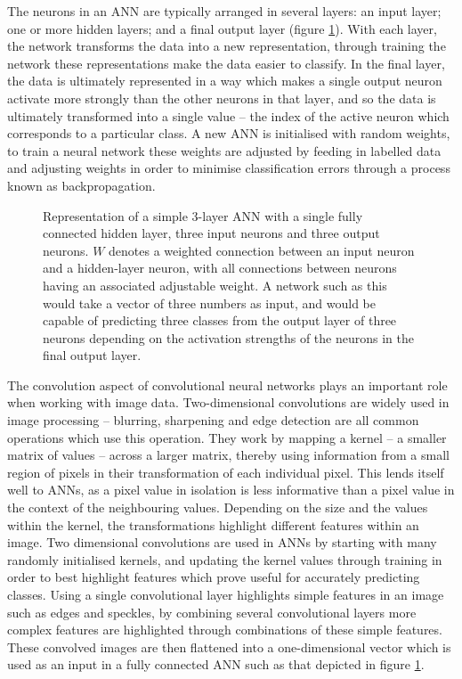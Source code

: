 \documentclass[a4paper,11pt,twoside,openright]{scrbook}
\begin{document}
The neurons in an ANN are typically arranged in several layers: an input layer; one or more hidden layers; and a final output layer (figure \ref{figure:nn_layers}).
With each layer, the network transforms the data into a new representation, through training the network these representations make the data easier to classify.
In the final layer, the data is ultimately represented in a way which makes a single output neuron activate more strongly than the other neurons in that layer, and so the data is ultimately transformed into a single value -- the index of the active neuron which corresponds to a particular class.
A new ANN is initialised with random weights, to train a neural network these weights are adjusted by feeding in labelled data and adjusting weights in order to minimise classification errors through a process known as backpropagation.\cite{Rumelhart1986}



\begin{figure}
\fcapsideleft
{
    \caption[Representation of a simple ANN]{Representation of a simple 3-layer ANN with a single fully connected hidden layer, three input neurons and three output neurons. $W$ denotes a weighted connection between an input neuron and a hidden-layer neuron, with all connections between neurons having an associated adjustable weight. A network such as this would take a vector of three numbers as input, and would be capable of predicting three classes from the output layer of three neurons depending on the activation strengths of the neurons in the final output layer.}
} {
    
    \label{figure:nn_layers}
}
\end{figure}

The convolution aspect of convolutional neural networks plays an important role when working with image data.
Two-dimensional convolutions are widely used in image processing -- blurring, sharpening and edge detection are all common operations which use this operation.
They work by mapping a kernel -- a smaller matrix of values -- across a larger matrix, thereby using information from a small region of pixels in their transformation of each individual pixel.
This lends itself well to ANNs, as a pixel value in isolation is less informative than a pixel value in the context of the neighbouring values.
Depending on the size and the values within the kernel, the transformations highlight different features within an image.
Two dimensional convolutions are used in ANNs by starting with many randomly initialised kernels, and updating the kernel values through training in order to best highlight features which prove useful for accurately predicting classes.
Using a single convolutional layer highlights simple features in an image such as edges and speckles, by combining several convolutional layers more complex features are highlighted through combinations of these simple features.
These convolved images are then flattened into a one-dimensional vector which is used as an input in a fully connected ANN such as that depicted in figure \ref{figure:nn_layers}.
\end{document}
